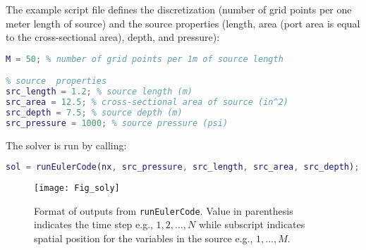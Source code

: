\documentclass[10pt]{article}
\begin{document}
The example script file defines the discretization (number of grid points per one meter length of source) and the source properties (length, area (port area is equal to the cross-sectional area), depth, and pressure):
\begin{lstlisting}[language=Matlab]
% define discretization
M = 50; % number of grid points per 1m of source length

% source  properties
src_length = 1.2; % source length (m)
src_area = 12.5; % cross-sectional area of source (in^2)
src_depth = 7.5; % source depth (m)
src_pressure = 1000; % source pressure (psi)
\end{lstlisting}

The solver is run by calling:
\begin{lstlisting}[language=Matlab]
sol = runEulerCode(nx, src_pressure, src_length, src_area, src_depth);
\end{lstlisting}

\begin{figure}[b!]
\centering
\texttt{[image: Fig\_soly]}
\caption{Format of outputs from \texttt{runEulerCode}. Value in parenthesis indicates the time step e.g., $1, 2, \hdots, N$ while subscript indicates spatial position for the variables in the source e.g., $1, \hdots, M$.}
\label{fig:sol y}
\end{figure}

\end{document}
